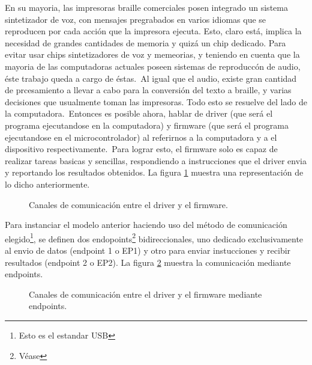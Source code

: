 En su mayoria, las impresoras braille comerciales posen integrado un sistema
sintetizador de voz, con mensajes pregrabados en varios idiomas que se
reproducen por cada acci\'on que la impresora ejecuta. Esto, claro est\'a,
implica la necesidad de grandes cantidades de memoria y quiz\'a un chip
dedicado. Para evitar usar chips sintetizadores de voz y memeorias, y
teniendo en cuenta que la mayoria de las computadoras actuales poseen sistemas
de reproducc\'on de audio, \'este trabajo queda a cargo de \'estas.\
Al igual que el audio, existe gran cantidad de prcesamiento a llevar a cabo
para la conversi\'on del texto a braille, y varias decisiones que usualmente
toman las impresoras. Todo esto se resuelve del lado de la computadora.\
Entonces es posible ahora, hablar de driver (que ser\'a el programa
ejecutandose en la computadora) y firmware (que ser\'a el programa ejecutandose
en el microcontrolador) al referirnos a la computadora y a el dispositivo
respectivamente.\
Para lograr esto, el firmware solo es capaz de realizar tareas basicas y
sencillas, respondiendo a instrucciones que el driver envia y reportando los
resultados obtenidos. La figura \ref{fig:driver_firmware} muestra una
representaci\'on de lo dicho anteriormente.\\

\begin{figure}[htp]
\centering
{}
\caption{Canales de comunicaci\'on entre el driver y el firmware.}
\label{fig:driver_firmware}
\end{figure}


Para instanciar el modelo anterior haciendo uso del m\'etodo de comunicaci\'on
elegido\footnote{Esto es el estandar USB}, se definen dos
endopoints\footnote{V\'ease } bidireccionales, uno
dedicado exclusivamente al envio de datos (endpoint 1 o EP1) y otro para enviar
instucciones y recibir resultados (endpoint 2 o EP2). La figura
\ref{fig:driver_eps_firmware} muestra la comunicaci\'on mediante endpoints.


\begin{figure}[htp]
\centering
{}
\caption{Canales de comunicaci\'on entre el driver y el firmware mediante
endpoints.}
\label{fig:driver_eps_firmware}
\end{figure}


